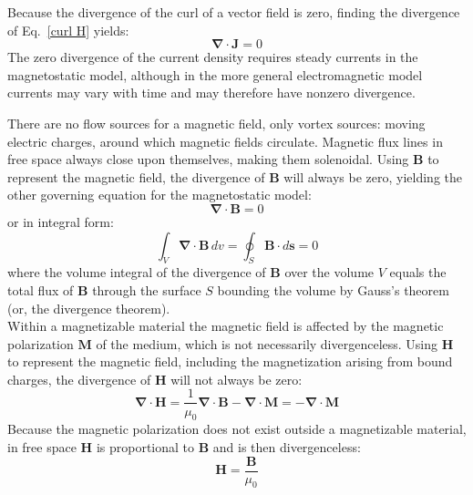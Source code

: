 Because the divergence of the curl of a vector field is zero, finding the divergence of Eq.~\ref{curl H} yields:
\begin{equation}\label{div J}
\mathbf{\nabla} \cdot \mathbf{J} = 0
\end{equation}
{\noindent}The zero divergence of the current density requires steady currents in the magnetostatic model, although in the more general electromagnetic model currents may vary with time and may therefore have nonzero divergence.

There are no flow sources for a magnetic field, only vortex sources: moving electric charges, around which magnetic fields circulate.  Magnetic flux lines in free space always close upon themselves, making them solenoidal.  Using $\mathbf{B}$ to represent the magnetic field, the divergence of $\mathbf{B}$ will always be zero, yielding the other governing equation for the magnetostatic model:
\begin{equation}\label{div B}
\mathbf{\nabla} \cdot \mathbf{B} = 0
\end{equation}
or in integral form:
\begin{equation}\label{int B.ds}
\int_V \mathbf{\nabla} \cdot \mathbf{B}\,dv = \oint_S \mathbf{B} \cdot d\mathbf{s} = 0
\end{equation}
{\noindent}where the volume integral of the divergence of $\mathbf{B}$ over the volume $V$ equals the total flux of $\mathbf{B}$ through the surface $S$ bounding the volume by Gauss's theorem (or, the divergence theorem).\\

Within a magnetizable material the magnetic field is affected by the magnetic polarization $\mathbf{M}$ of the medium, which is not necessarily divergenceless.  Using $\mathbf{H}$ to represent the magnetic field, including the magnetization arising from bound charges, the divergence of $\mathbf{H}$ will not always be zero:
\begin{equation}\label{div H}
\mathbf{\nabla} \cdot \mathbf{H} = \frac{1}{\mu_0} \mathbf{\nabla} \cdot \mathbf{B} - \mathbf{\nabla} \cdot \mathbf{M} = - \mathbf{\nabla} \cdot \mathbf{M}
\end{equation}
Because the magnetic polarization does not exist outside a magnetizable material, in free space $\mathbf{H}$ is proportional to $\mathbf{B}$ and is then divergenceless:
\begin{equation}\label{H free space}
\mathbf{H} = \frac{\mathbf{B}}{\mu_0}
\end{equation}

